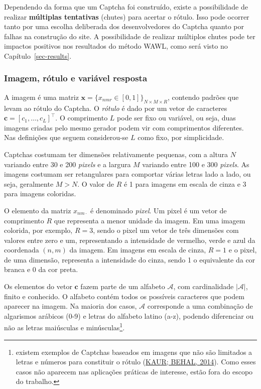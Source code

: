 \documentclass[12pt,twoside,brazilian]{book}
\begin{document}
Dependendo da forma que um Captcha foi construído, existe a
possibilidade de realizar \textbf{múltiplas tentativas} (chutes) para
acertar o rótulo. Isso pode ocorrer tanto por uma escolha deliberada dos
desenvolvedores do Captcha quanto por falhas na construção do site. A
possibilidade de realizar múltiplos chutes pode ter impactos positivos
nos resultados do método WAWL, como será visto no
Capítulo~\ref{sec-results}.

\hypertarget{imagem-ruxf3tulo-e-variuxe1vel-resposta}{%
\subsubsection{Imagem, rótulo e variável
resposta}\label{imagem-ruxf3tulo-e-variuxe1vel-resposta}}

A imagem é uma matriz
\(\mathbf x = \{x_{nmr} \in [0,1]\}_{N\times M \times R}\), contendo
padrões que levam ao rótulo do Captcha. O \emph{rótulo} é dado por um
vetor de caracteres \(\mathbf c = [c_1,\dots,c_L]^\top\). O comprimento
\(L\) pode ser fixo ou variável, ou seja, duas imagens criadas pelo
mesmo gerador podem vir com comprimentos diferentes. Nas definições que
seguem considerou-se \(L\) como fixo, por simplicidade.

Captchas costumam ter dimensões relativamente pequenas, com a altura
\(N\) variando entre 30 e 200 \emph{pixels} e a largura \(M\) variando
entre 100 e 300 \emph{pixels}. As imagens costumam ser retangulares para
comportar várias letras lado a lado, ou seja, geralmente \(M > N\). O
valor de \(R\) é 1 para imagens em escala de cinza e 3 para imagens
coloridas.

O elemento da matriz \(x_{nm\cdot}\) é denominado \emph{pixel}. Um pixel
é um vetor de comprimento \(R\) que representa a menor unidade da
imagem. Em uma imagem colorida, por exemplo, \(R=3\), sendo o pixel um
vetor de três dimensões com valores entre zero e um, representando a
intensidade de vermelho, verde e azul da coordenada \((n, m)\) da
imagem. Em imagens em escala de cinza, \(R=1\) e o pixel, de uma
dimensão, representa a intensidade do cinza, sendo 1 o equivalente da
cor branca e 0 da cor preta.

Os elementos do vetor \(\mathbf c\) fazem parte de um alfabeto
\(\mathcal A\), com cardinalidade \(|\mathcal A|\), finito e conhecido.
O alfabeto contém todos os possíveis caracteres que podem aparecer na
imagem. Na maioria dos casos, \(\mathcal A\) corresponde a uma
combinação de algarismos arábicos (0-9) e letras do alfabeto latino
(a-z), podendo diferenciar ou não as letras maiúsculas e
minúsculas\footnote{existem exemplos de Captchas baseados em imagens que
  não são limitados a letras e números para constituir o rótulo
  (\protect\hyperlink{ref-kaur2014}{KAUR; BEHAL, 2014}). Como esses
  casos não aparecem nas aplicações práticas de interesse, estão fora do
  escopo do trabalho.}.
\end{document}
